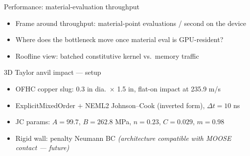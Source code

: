 \documentclass[aspectratio=169,11pt]{beamer}
\begin{document}
\begin{frame}{Performance: material-evaluation throughput}
\begin{itemize}
  \item Frame around throughput: material-point evaluations / second on the device
  \item Where does the bottleneck move once material eval is GPU-resident?
  \item Roofline view: batched constitutive kernel vs.\ memory traffic
\end{itemize}
\vspace{1em}
\begin{center}
\end{center}
\end{frame}

\begin{frame}{3D Taylor anvil impact --- setup}
\begin{itemize}
  \item OFHC copper slug: 0.3 in dia.\ $\times$ 1.5 in, flat-on impact at 235.9 m/s
  \item ExplicitMixedOrder $+$ NEML2 Johnson--Cook (inverted form), $\Delta t = 10$ ns
  \item JC params: $A{=}99.7$, $B{=}262.8$ MPa, $n{=}0.23$, $C{=}0.029$, $m{=}0.98$
  \item Rigid wall: penalty Neumann BC \emph{(architecture compatible with MOOSE contact --- future)}
\end{itemize}
\end{frame}
\end{document}
